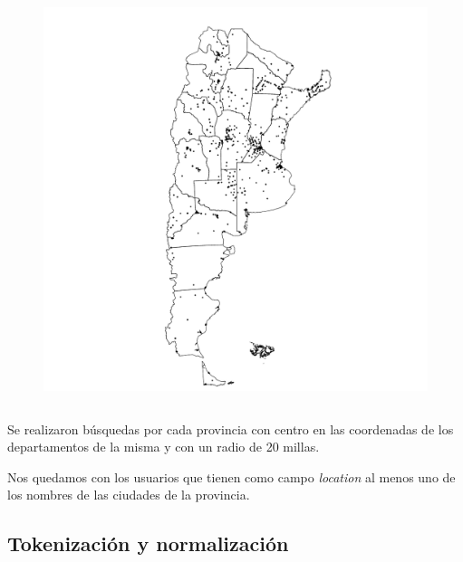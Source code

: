 \begin{frame}[t]
\begin{columns}
    \begin{column}{0.30\textwidth}
        \begin{figure}
            \includegraphics[width=\linewidth]{../src/images/mapaprovinciasConPuntos.pdf}
            \label{fig:mapaPuntos}
        \end{figure}
    \end{column}
\end{columns}

Se realizaron búsquedas por cada provincia con centro en las coordenadas de los departamentos de la misma y con un radio de 20 millas. 

Nos quedamos con los usuarios que tienen como campo \textit{location} al menos uno de los nombres de las ciudades de la provincia. 



\end{frame}

\subsection{Tokenización y normalización}

